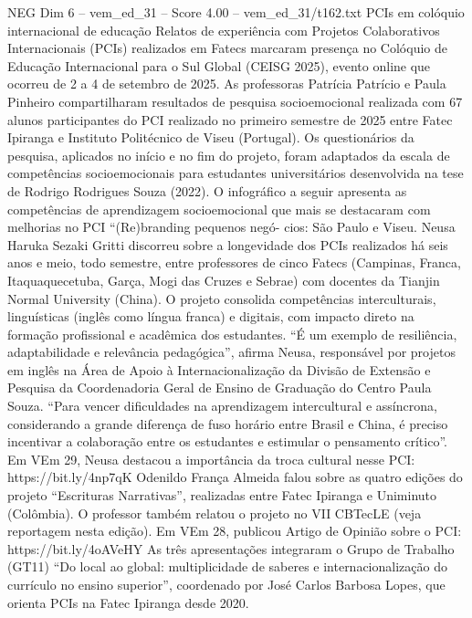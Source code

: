 \begin{textsample}{NEG Dim 6 – vem\_ed\_31 – Score 4.00 – vem\_ed\_31/t162.txt}  \label{ex:f6_neg_110}
PCIs em colóquio internacional de educação Relatos de experiência com Projetos Colaborativos Internacionais (PCIs) realizados em Fatecs marcaram presença no Colóquio de Educação Internacional para o Sul Global (CEISG 2025), evento online que ocorreu de 2 a 4 de setembro de 2025.
As professoras Patrícia Patrício e Paula Pinheiro compartilharam resultados de pesquisa socioemocional realizada com 67 alunos participantes do PCI realizado no primeiro semestre de 2025 entre Fatec Ipiranga e Instituto Politécnico de Viseu (Portugal).
Os questionários da pesquisa, aplicados no início e no fim do projeto, foram adaptados da escala de competências socioemocionais para estudantes universitários desenvolvida na tese de Rodrigo Rodrigues Souza (2022).
O infográfico a seguir apresenta as competências de aprendizagem socioemocional que mais se destacaram com melhorias no PCI “(Re)branding pequenos negó- cios: São Paulo e Viseu.
Neusa Haruka Sezaki Gritti discorreu sobre a longevidade dos PCIs realizados há seis anos e meio, todo semestre, entre professores de cinco Fatecs (Campinas, Franca, Itaquaquecetuba, Garça, Mogi das Cruzes e Sebrae) com docentes da Tianjin Normal University (China).
O projeto consolida competências interculturais, linguísticas (inglês como língua franca) e digitais, com impacto direto na formação profissional e acadêmica dos estudantes. “É um exemplo de resiliência, adaptabilidade e relevância pedagógica”, afirma Neusa, responsável por projetos em inglês na Área de Apoio à Internacionalização da Divisão de Extensão e Pesquisa da Coordenadoria Geral de Ensino de Graduação do Centro Paula Souza. “Para vencer dificuldades na aprendizagem intercultural e assíncrona, considerando a grande diferença de fuso horário entre Brasil e China, é preciso incentivar a colaboração entre os estudantes e estimular o pensamento crítico”.
Em VEm 29, Neusa destacou a importância da troca cultural nesse PCI: https://bit.ly/4np7qK Odenildo França Almeida falou sobre as quatro edições do projeto “Escrituras Narrativas”, realizadas entre Fatec Ipiranga e Uniminuto (Colômbia).
O professor também relatou o projeto no VII CBTecLE (veja reportagem nesta edição).
Em VEm 28, publicou Artigo de Opinião sobre o PCI: https://bit.ly/4oAVeHY As três apresentações integraram o Grupo de Trabalho (GT11) “Do local ao global: multiplicidade de saberes e internacionalização do currículo no ensino superior”, coordenado por José Carlos Barbosa Lopes, que orienta PCIs na Fatec Ipiranga desde 2020.

\end{textsample}
